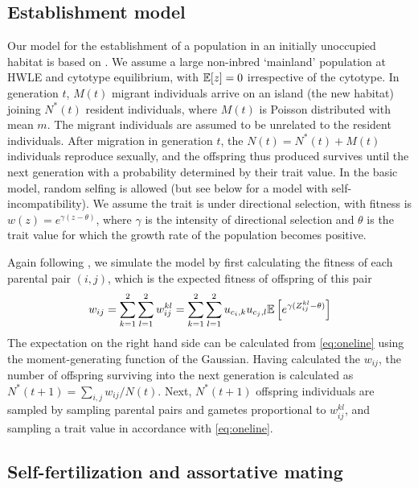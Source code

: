 \documentclass[12pt,a4paper]{article}
\begin{document}
\subsection*{Establishment model}

Our model for the establishment of a population in an initially unoccupied
habitat is based on \cite{barton2018}.
We assume a large non-inbred `mainland' population at HWLE and cytotype
equilibrium, with $\mathbb{E}[z] = 0$ irrespective of the cytotype.
In generation $t$, $M(t)$ migrant individuals arrive on an island (the new
habitat) joining $N^\ast(t)$ resident individuals, where $M(t)$ is Poisson
distributed with mean $m$. 
The migrant individuals are assumed to be unrelated to the resident
individuals.
After migration in generation $t$, the $N(t) = N^\ast(t) + M(t)$ individuals
reproduce sexually, and the offspring thus produced survives until the next
generation with a probability determined by their trait value.
In the basic model, random selfing is allowed (but see below for a model with
self-incompatibility).
We assume the trait is under directional selection, with fitness is $w(z) =
e^{\gamma(z - \theta)}$, where $\gamma$ is the intensity of directional
selection and $\theta$ is the trait value for which the growth rate of the
population becomes positive.

Again following \cite{barton2018}, we simulate the model by first calculating
the fitness of each parental pair $(i,j)$, which is the expected fitness of
offspring of this pair
\begin{equation}
  w_{ij}
    = \sum_{k=1}^2\sum_{l=1}^2 w_{ij}^{kl}
    = \sum_{k=1}^2\sum_{l=1}^2 u_{c_{i},k}u_{c_{j},l}
        \mathbb{E}\left[e^{\gamma(Z_{ij}^{kl} - \theta)}\right]
\end{equation}
The expectation on the right hand side can be calculated from \cref{eq:oneline}
using the moment-generating function of the Gaussian.
Having calculated the $w_{ij}$, the number of offspring surviving into the next
generation is calculated as $N^\ast(t+1) = \sum_{i,j}w_{ij}/N(t)$.
Next, $N^\ast(t+1)$ offspring individuals are sampled by sampling parental
pairs and gametes proportional to $w_{ij}^{kl}$, and sampling a trait value
in accordance with \cref{eq:oneline}. 


\subsection*{Self-fertilization and assortative mating}
\end{document}
